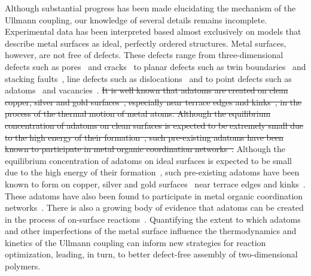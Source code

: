 \documentclass[aps,prb,amsmath,amssymb,11pt]{revtex4-1}
\newcommand{\zhzh}{\color{blue}}
\begin{document}
Although substantial progress has been made elucidating the mechanism of the Ullmann coupling, our knowledge of several details remains incomplete. Experimental data has been interpreted based almost exclusively on models that describe metal surfaces as ideal, perfectly ordered structures. 
%
Metal surfaces, however, are not free of defects. These defects range from three-dimensional defects such as pores~\cite{ullmann_72} and cracks~\cite{ullmann_73} to planar defects such as twin boundaries~\cite{ullmann_74} and stacking faults~\cite{ullmann_75}, line defects such as dislocations~\cite{Ullmann_76} and to point defects such as adatoms~\cite{Ullmann_77} and vacancies~\cite{ullmann_78}.
%
\sout{It is well known that adatoms are created on clean copper, silver and gold surfaces~\cite{ullmann_79, ullmann_58}, especially near terrace edges and kinks~\cite{ullmann_84, ullmann_85}, in the process of the thermal motion of metal atoms. 
Although the equilibrium concentration of adatoms on clean surfaces is expected to be extremely small due to the high energy of their formation~\cite{chemeurope2017}, such pre-existing adatoms have been known to participate in metal organic coordination networks~\cite{ullmann_80, ullmann_81, ullmann_82, ullmann_83}.}
{\zhzh Although the equilibrium concentration of adatoms on ideal surfaces is expected to be small due to the high energy of their formation~\cite{chemeurope2017}, such pre-existing adatoms have been known to form on copper, silver and gold surfaces~\cite{ullmann_79, ullmann_58} near terrace edges and kinks~\cite{ullmann_84, ullmann_85, ullmann_171}. These adatoms have also been found to participate in metal organic coordination networks~\cite{ullmann_80, ullmann_81, ullmann_82, ullmann_83, ullmann_170}.}
There is also a growing body of evidence that adatoms can be created in the process of on-surface reactions~\cite{ullmann_146, ullmann_53, chematerial2019, ullmann_147, chemeurope2017, ullmann_98, ullmann_91}. %
Quantifying the extent to which adatoms and other imperfections of the metal surface influence the thermodynamics and kinetics of the Ullmann coupling can inform new strategies for reaction optimization, leading, in turn, to better defect-free assembly of two-dimensional polymers. 
\end{document}
